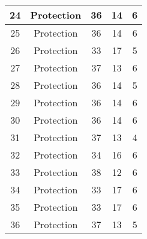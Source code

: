 \documentclass[results.tex]{subfiles}
\begin{document}
\begin{center}
\begin{tabular}{| c || c | c | c | c |}
            \hline
            24                      & Protection                   & 36                     & 14                      & 6                    \\
            \hline
            25                      & Protection                   & 36                     & 14                      & 6                    \\
            \hline
            26                      & Protection                   & 33                     & 17                      & 5                    \\
            \hline
            27                      & Protection                   & 37                     & 13                      & 6                    \\
            \hline
            28                      & Protection                   & 36                     & 14                      & 5                    \\
            \hline
            29                      & Protection                   & 36                     & 14                      & 6                    \\
            \hline
            30                      & Protection                   & 36                     & 14                      & 6                    \\
            \hline
            31                      & Protection                   & 37                     & 13                      & 4                    \\
            \hline
            32                      & Protection                   & 34                     & 16                      & 6                    \\
            \hline
            33                      & Protection                   & 38                     & 12                      & 6                    \\
            \hline
            34                      & Protection                   & 33                     & 17                      & 6                    \\
            \hline
            35                      & Protection                   & 33                     & 17                      & 6                    \\
            \hline
            36                      & Protection                   & 37                     & 13                      & 5                    \\

\end{tabular}
\end{center}
\end{document}
